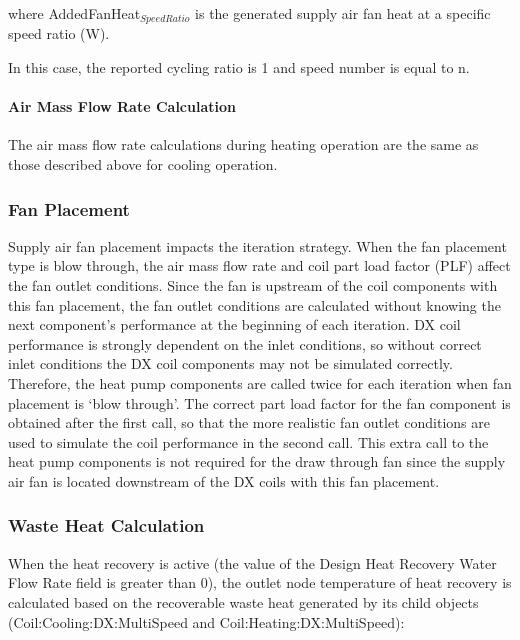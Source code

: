 where AddedFanHeat\(_{SpeedRatio}\) is the generated supply air fan heat at a specific speed ratio (W).

In this case, the reported cycling ratio is 1 and speed number is equal to n.

\paragraph{Air Mass Flow Rate Calculation}\label{air-mass-flow-rate-calculation-3}

The air mass flow rate calculations during heating operation are the same as those described above for cooling operation.

\subsubsection{Fan Placement}\label{fan-placement}

Supply air fan placement impacts the iteration strategy. When the fan placement type is blow through, the air mass flow rate and coil part load factor (PLF) affect the fan outlet conditions. Since the fan is upstream of the coil components with this fan placement, the fan outlet conditions are calculated without knowing the next component's performance at the beginning of each iteration. DX coil performance is strongly dependent on the inlet conditions, so without correct inlet conditions the DX coil components may not be simulated correctly. Therefore, the heat pump components are called twice for each iteration when fan placement is `blow through'. The correct part load factor for the fan component is obtained after the first call, so that the more realistic fan outlet conditions are used to simulate the coil performance in the second call. This extra call to the heat pump components is not required for the draw through fan since the supply air fan is located downstream of the DX coils with this fan placement.

\subsubsection{Waste Heat Calculation}\label{waste-heat-calculation-1}

When the heat recovery is active (the value of the Design Heat Recovery Water Flow Rate field is greater than 0), the outlet node temperature of heat recovery is calculated based on the recoverable waste heat generated by its child objects (Coil:Cooling:DX:MultiSpeed and Coil:Heating:DX:MultiSpeed):

